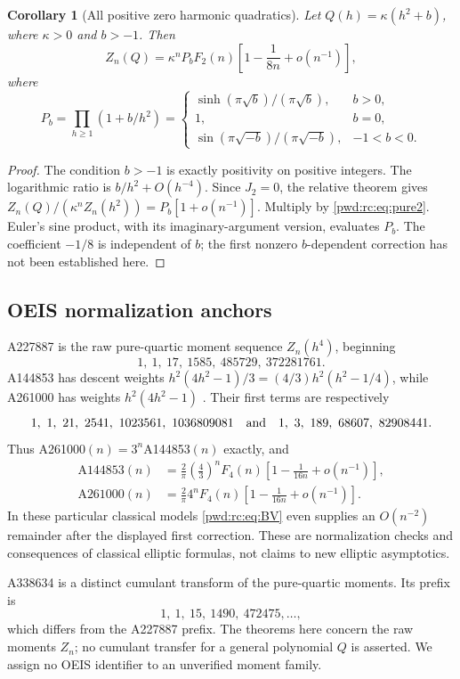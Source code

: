 \documentclass[11pt,letterpaper]{article}
\numberwithin{equation}{section}
\newtheorem{corollary}[theorem]{Corollary}
\theoremstyle{remark}\newtheorem{remark}[theorem]{Remark}
\begin{document}
\begin{corollary}[All positive zero harmonic quadratics]\label{pwd:rc:cor:quadratic}
Let $Q(h)=\kappa(h^2+b)$, where $\kappa>0$ and $b>-1$. Then
\begin{equation}\label{pwd:rc:eq:quadratic-poly}
 Z_n(Q)=\kappa^nP_bF_2(n)\left[1-\frac1{8n}+o(n^{-1})\right],
\end{equation}
where
\[
 P_b=\prod_{h\ge1}(1+b/h^2)=
 \begin{cases}
 \sinh(\pi\sqrt b)/(\pi\sqrt b),&b>0,\\
 1,&b=0,\\
 \sin(\pi\sqrt{-b})/(\pi\sqrt{-b}),&-1<b<0.
 \end{cases}
\]
\end{corollary}
\begin{proof}
The condition $b>-1$ is exactly positivity on positive integers. The logarithmic ratio is $b/h^2+O(h^{-4})$. Since $J_2=0$, the relative theorem gives $Z_n(Q)/(\kappa^nZ_n(h^2))=P_b[1+o(n^{-1})]$. Multiply by \eqref{pwd:rc:eq:pure2}. Euler's sine product, with its imaginary-argument version, evaluates $P_b$. The coefficient $-1/8$ is independent of $b$; the first nonzero $b$-dependent correction has not been established here.
\end{proof}

\subsection{OEIS normalization anchors}
A227887 is the raw pure-quartic moment sequence $Z_n(h^4)$, beginning
\[
 1,\ 1,\ 17,\ 1585,\ 485729,\ 372281761.
\]
A144853 has descent weights $h^2(4h^2-1)/3=(4/3)h^2(h^2-1/4)$, while A261000 has weights $h^2(4h^2-1)$ \cite{oeisquartic}. Their first terms are respectively
\[
 1,\ 1,\ 21,\ 2541,\ 1023561,\ 1036809081
 \quad\hbox{and}\quad
 1,\ 3,\ 189,\ 68607,\ 82908441.
\]
Thus A261000$(n)=3^n$A144853$(n)$ exactly, and
\begin{align*}
 \mathrm{A144853}(n)&=\frac2\pi\left(\frac43\right)^nF_4(n)
 \left[1-\frac1{16n}+o(n^{-1})\right],\\
 \mathrm{A261000}(n)&=\frac2\pi4^nF_4(n)
 \left[1-\frac1{16n}+o(n^{-1})\right].
\end{align*}
In these particular classical models \eqref{pwd:rc:eq:BV} even supplies an $O(n^{-2})$ remainder after the displayed first correction. These are normalization checks and consequences of classical elliptic formulas, not claims to new elliptic asymptotics.

A338634 is a distinct cumulant transform of the pure-quartic moments. Its prefix is
\[
 1,\ 1,\ 15,\ 1490,\ 472475,\ldots,
\]
which differs from the A227887 prefix. The theorems here concern the raw moments $Z_n$; no cumulant transfer for a general polynomial $Q$ is asserted. We assign no OEIS identifier to an unverified moment family.
\end{document}
